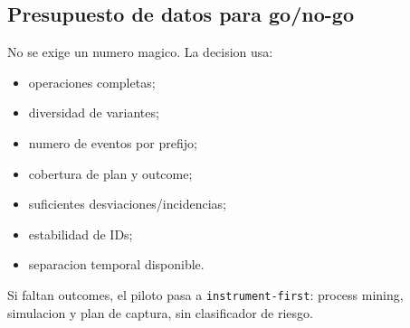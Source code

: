 \documentclass[
  spanish,
  10pt,
  a4paper,
]{article}
\providecommand{\tightlist}{%
  \setlength{\itemsep}{0pt}\setlength{\parskip}{0pt}}
\begin{document}
\subsection{Presupuesto de datos para
go/no-go}\label{presupuesto-de-datos-para-gono-go}

No se exige un numero magico. La decision usa:

\begin{itemize}
\tightlist
\item
  operaciones completas;
\item
  diversidad de variantes;
\item
  numero de eventos por prefijo;
\item
  cobertura de plan y outcome;
\item
  suficientes desviaciones/incidencias;
\item
  estabilidad de IDs;
\item
  separacion temporal disponible.
\end{itemize}

Si faltan outcomes, el piloto pasa a \texttt{instrument-first}: process
mining, simulacion y plan de captura, sin clasificador de riesgo.
\end{document}
